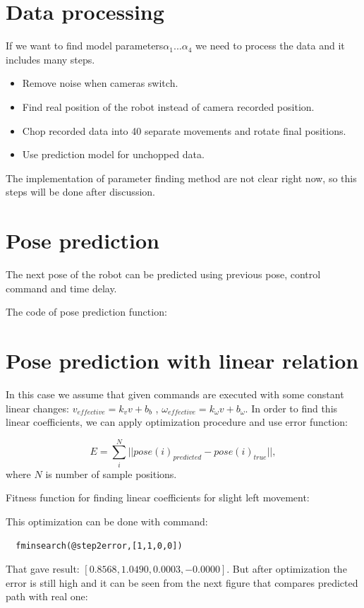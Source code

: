 \documentclass[a4paper, 12pt]{article}
\begin{document}
\section{Data processing}
If we want to find model parameters$\alpha_1 ...\alpha_4$ we need to process the data and it includes many steps.

\begin{itemize}
\item Remove noise when cameras switch.
\item Find real position of the robot instead of camera recorded position.
\item Chop recorded data into 40 separate movements and rotate final positions.
\item Use prediction model for unchopped data.
\end{itemize}
The implementation of parameter finding method are not clear right now, so this steps will be done after discussion.




\section{Pose prediction}
The next pose of the robot can be predicted using previous pose, control command and time delay.

The code of pose prediction function:



\section{Pose prediction with linear relation}

In this case we assume that given commands are executed with some constant linear changes: $v_{effective} =k_v v+b_b $ , $\omega_{effective} =k_{\omega} v+b_{\omega} $. In order to find this linear coefficients, we can apply optimization procedure and use error function:

\begin{equation}
E = \sum\limits_i^N ||pose(i)_{predicted} - pose(i)_{true}||,
\end{equation}
where $N$ is number of sample positions.

Fitness function for finding linear coefficients for slight left movement:




This optimization can be done with command:
\begin{lstlisting}
  fminsearch(@step2error,[1,1,0,0])
\end{lstlisting}
That gave result: $[0.8568,    1.0490,    0.0003,   -0.0000]$. But after optimization the error is still high and it can be seen from the next figure that compares predicted path with real one:
\end{document}
